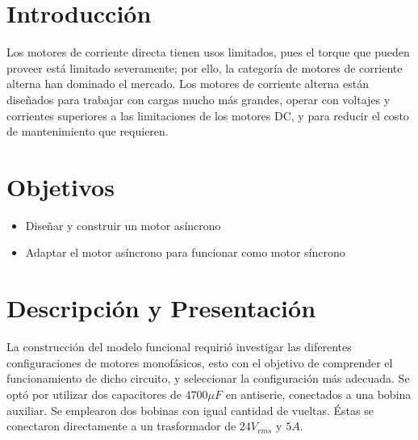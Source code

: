 \section{Introducci\'on}
Los motores de corriente directa tienen usos limitados, pues el torque que pueden proveer est\'a limitado severamente; por
ello, la categor\'ia de motores de corriente alterna han dominado el mercado. Los motores de corriente alterna est\'an 
dise\~nados para trabajar con cargas mucho m\'as grandes, operar con voltajes y corrientes superiores a las limitaciones 
de los motores DC, y para reducir el costo de mantenimiento que requieren.

\section{Objetivos}
\begin{itemize}
 \item Dise\~nar y construir un motor as\'incrono
 \item Adaptar el motor as\'incrono para funcionar como motor s\'incrono
\end{itemize}

\section{Descripci\'on y Presentaci\'on}
La construcci\'on del modelo funcional requiri\'o investigar las diferentes configuraciones de motores monof\'asicos, esto 
con el objetivo de comprender el funcionamiento de dicho circuito, y seleccionar la configuraci\'on m\'as adecuada.
Se opt\'o por utilizar dos capacitores de $4700 \mu F$ en antiserie, conectados a una bobina auxiliar. Se emplearon dos 
bobinas con igual cantidad de vueltas. \'Estas se conectaron directamente a un trasformador de $24 V_{rms}$ y $5 A$.